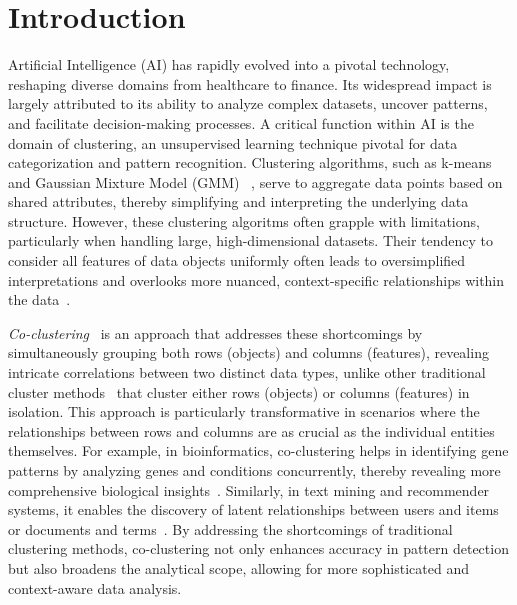 
\section{Introduction}
Artificial Intelligence (AI) has rapidly evolved into a pivotal technology, reshaping diverse domains from healthcare to finance. Its widespread impact is largely attributed to its ability to analyze complex datasets, uncover patterns, and facilitate decision-making processes. A critical function within AI is the domain of clustering, an unsupervised learning technique pivotal for data categorization and pattern recognition. Clustering algorithms, such as k-means~\cite{} and Gaussian Mixture Model (GMM) ~\cite{}, serve to aggregate data points based on shared attributes, thereby simplifying and interpreting the underlying data structure. However, these clustering algoritms often grapple with limitations, particularly when handling large, high-dimensional datasets. Their tendency to consider all features of data objects uniformly often leads to oversimplified interpretations and overlooks more nuanced, context-specific relationships within the data~\cite{}.

\textit{Co-clustering}~\cite{} is an approach that addresses these shortcomings by simultaneously grouping both rows (objects) and columns (features), revealing intricate correlations between two distinct data types, unlike other traditional cluster methods~\cite{} that cluster either rows (objects) or columns (features) in isolation. This approach is particularly transformative in scenarios where the relationships between rows and columns are as crucial as the individual entities themselves. For example, in bioinformatics, co-clustering helps in identifying gene patterns by analyzing genes and conditions concurrently, thereby revealing more comprehensive biological insights~\cite{}. Similarly, in text mining and recommender systems, it enables the discovery of latent relationships between users and items or documents and terms~\cite{}. By addressing the shortcomings of traditional clustering methods, co-clustering not only enhances accuracy in pattern detection but also broadens the analytical scope, allowing for more sophisticated and context-aware data analysis.

